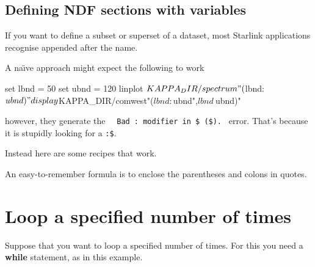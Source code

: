 \documentclass[twoside,11pt,nolof]{starlink}
\begin{document}
\subsection{Defining NDF sections with
variables\label{sc4_se_NDF_section}}

If you want to define a subset or superset of a dataset, most Starlink
applications recognise 
appended after the name.

A na\"{\i}ve approach might expect the following to work

\begin{small}
\begin{terminalv}
     set lbnd = 50
     set ubnd = 120
     linplot $KAPPA_DIR/spectrum"($lbnd:$ubnd)"
     display $KAPPA_DIR/comwest"($lbnd:$ubnd",$lbnd~$ubnd)"
\end{terminalv}
\end{small}
however, they generate the ~~\texttt{Bad : modifier in \$ (\$).}~ error.
That's because it is stupidly looking for a  \texttt{:\$}.

Instead here are some recipes that work.

\begin{small}
\end{small}
An easy-to-remember formula is to enclose the parentheses and colons
in quotes.

\newpage
\section{Loop a specified number of times
\label{sc4_se_loop_times}}
Suppose that you want to loop a specified number of times.  For this
you need a \textbf{while} statement, as in this example.
\end{document}
